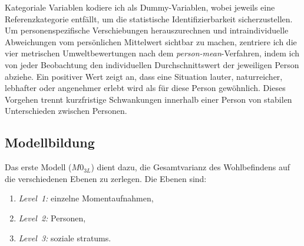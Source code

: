 Kategoriale Variablen kodiere ich als Dummy-Variablen, wobei jeweils eine Referenzkategorie entfällt, um die statistische Identifizierbarkeit sicherzustellen. Um personenspezifische Verschiebungen herauszurechnen und intraindividuelle Abweichungen vom persönlichen Mittelwert sichtbar zu machen, zentriere ich die vier metrischen Umweltbewertungen nach dem \emph{person-mean}-Verfahren, indem ich von jeder Beobachtung den individuellen Durchschnittswert der jeweiligen Person abziehe. Ein positiver Wert zeigt an, dass eine Situation lauter, naturreicher, lebhafter oder angenehmer erlebt wird als für diese Person gewöhnlich. Dieses Vorgehen trennt kurzfristige Schwankungen innerhalb einer Person von stabilen Unterschieden zwischen Personen.

\subsection*{Modellbildung}

Das erste Modell ($M0_{3L}$) dient dazu, die Gesamtvarianz des Wohlbefindens auf die verschiedenen Ebenen zu zerlegen. Die Ebenen sind:

\begin{enumerate}
    \item \emph{Level~1:} einzelne Momentaufnahmen,
    \item \emph{Level~2:} Personen,
    \item \emph{Level~3:} soziale \glspl{stratum}.
\end{enumerate}

